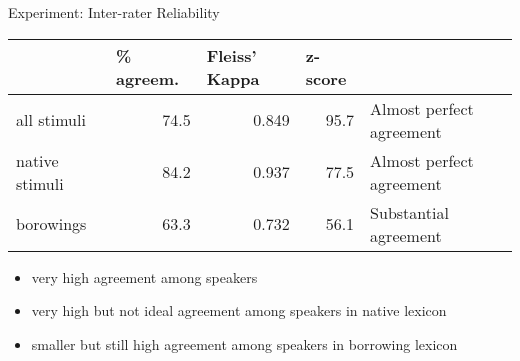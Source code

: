 \documentclass[13pt, t]{beamer}
\begin{document}
\begin{frame}{Experiment: Inter-rater Reliability}
\small
\begin{tabular}{|l|r|r|r|l|}
\hline
 & \multicolumn{1}{l|}{\% agreem.} & \multicolumn{1}{l|}{Fleiss' Kappa} & \multicolumn{1}{l|}{z-score} & \citep{fleiss71} \\ \hline
all stimuli & 74.5 & 0.849 & 95.7 & Almost perfect agreement\\ \hline
native stimuli & 84.2 & 0.937 & 77.5 & Almost perfect agreement \\ \hline
borowings & 63.3 & 0.732 & 56.1 & Substantial agreement \\ \hline
\end{tabular}
\normalsize
\vfill
\pause
\begin{itemize}
\item very high agreement among speakers
\item very high but not ideal agreement  among speakers in native lexicon
\item smaller but still high agreement  among speakers in borrowing lexicon
\end{itemize}
\end{frame}
\end{document}

